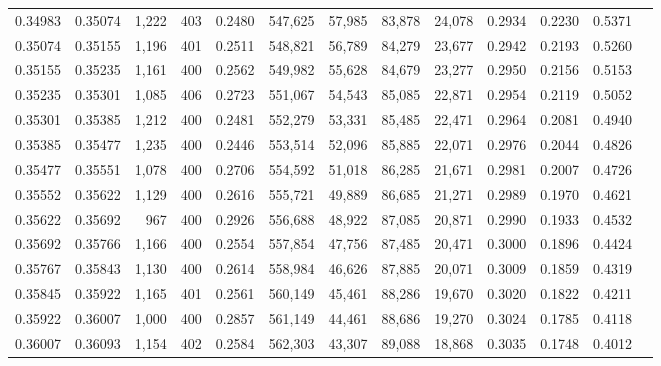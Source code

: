 \begin{tabular}{rrrrrrrrrrrrr}
0.34983 & 0.35074 &  1,222 & 403 &                                     0.2480 & 547,625 &  57,985 &  83,878 &  24,078 & 0.2934 & 0.2230 & 0.5371 \\
0.35074 & 0.35155 &  1,196 & 401 &                                     0.2511 & 548,821 &  56,789 &  84,279 &  23,677 & 0.2942 & 0.2193 & 0.5260 \\
0.35155 & 0.35235 &  1,161 & 400 &                                     0.2562 & 549,982 &  55,628 &  84,679 &  23,277 & 0.2950 & 0.2156 & 0.5153 \\
0.35235 & 0.35301 &  1,085 & 406 &                                     0.2723 & 551,067 &  54,543 &  85,085 &  22,871 & 0.2954 & 0.2119 & 0.5052 \\
0.35301 & 0.35385 &  1,212 & 400 &                                     0.2481 & 552,279 &  53,331 &  85,485 &  22,471 & 0.2964 & 0.2081 & 0.4940 \\
0.35385 & 0.35477 &  1,235 & 400 &                                     0.2446 & 553,514 &  52,096 &  85,885 &  22,071 & 0.2976 & 0.2044 & 0.4826 \\
0.35477 & 0.35551 &  1,078 & 400 &                                     0.2706 & 554,592 &  51,018 &  86,285 &  21,671 & 0.2981 & 0.2007 & 0.4726 \\
0.35552 & 0.35622 &  1,129 & 400 &                                     0.2616 & 555,721 &  49,889 &  86,685 &  21,271 & 0.2989 & 0.1970 & 0.4621 \\
0.35622 & 0.35692 &    967 & 400 &                                     0.2926 & 556,688 &  48,922 &  87,085 &  20,871 & 0.2990 & 0.1933 & 0.4532 \\
0.35692 & 0.35766 &  1,166 & 400 &                                     0.2554 & 557,854 &  47,756 &  87,485 &  20,471 & 0.3000 & 0.1896 & 0.4424 \\
0.35767 & 0.35843 &  1,130 & 400 &                                     0.2614 & 558,984 &  46,626 &  87,885 &  20,071 & 0.3009 & 0.1859 & 0.4319 \\
0.35845 & 0.35922 &  1,165 & 401 &                                     0.2561 & 560,149 &  45,461 &  88,286 &  19,670 & 0.3020 & 0.1822 & 0.4211 \\
0.35922 & 0.36007 &  1,000 & 400 &                                     0.2857 & 561,149 &  44,461 &  88,686 &  19,270 & 0.3024 & 0.1785 & 0.4118 \\
0.36007 & 0.36093 &  1,154 & 402 &                                     0.2584 & 562,303 &  43,307 &  89,088 &  18,868 & 0.3035 & 0.1748 & 0.4012 \\

\end{tabular}
